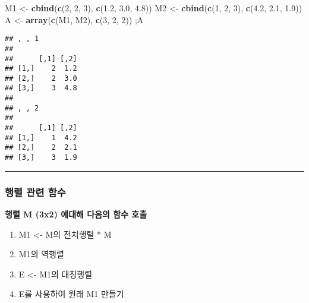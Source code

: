 \documentclass[]{article}
\newenvironment{Shaded}{\begin{snugshade}}{\end{snugshade}}
\newcommand{\KeywordTok}[1]{\textcolor[rgb]{0.13,0.29,0.53}{\textbf{#1}}}
\newcommand{\DecValTok}[1]{\textcolor[rgb]{0.00,0.00,0.81}{#1}}
\newcommand{\FloatTok}[1]{\textcolor[rgb]{0.00,0.00,0.81}{#1}}
\newcommand{\StringTok}[1]{\textcolor[rgb]{0.31,0.60,0.02}{#1}}
\newcommand{\CommentTok}[1]{\textcolor[rgb]{0.56,0.35,0.01}{\textit{#1}}}
\newcommand{\OperatorTok}[1]{\textcolor[rgb]{0.81,0.36,0.00}{\textbf{#1}}}
\newcommand{\NormalTok}[1]{#1}
\providecommand{\tightlist}{%
  \setlength{\itemsep}{0pt}\setlength{\parskip}{0pt}}
\begin{document}
\begin{Shaded}
\begin{Highlighting}[]
\NormalTok{M1 <-}\StringTok{ }\KeywordTok{cbind}\NormalTok{(}\KeywordTok{c}\NormalTok{(}\DecValTok{2}\NormalTok{, }\DecValTok{2}\NormalTok{, }\DecValTok{3}\NormalTok{), }\KeywordTok{c}\NormalTok{(}\FloatTok{1.2}\NormalTok{, }\FloatTok{3.0}\NormalTok{, }\FloatTok{4.8}\NormalTok{))}
\NormalTok{M2 <-}\StringTok{ }\KeywordTok{cbind}\NormalTok{(}\KeywordTok{c}\NormalTok{(}\DecValTok{1}\NormalTok{, }\DecValTok{2}\NormalTok{, }\DecValTok{3}\NormalTok{), }\KeywordTok{c}\NormalTok{(}\FloatTok{4.2}\NormalTok{, }\FloatTok{2.1}\NormalTok{, }\FloatTok{1.9}\NormalTok{))}
\NormalTok{A <-}\StringTok{ }\KeywordTok{array}\NormalTok{(}\KeywordTok{c}\NormalTok{(M1, M2), }\KeywordTok{c}\NormalTok{(}\DecValTok{3}\NormalTok{, }\DecValTok{2}\NormalTok{, }\DecValTok{2}\NormalTok{)) ;A}
\end{Highlighting}
\end{Shaded}

\begin{verbatim}
## , , 1
## 
##      [,1] [,2]
## [1,]    2  1.2
## [2,]    2  3.0
## [3,]    3  4.8
## 
## , , 2
## 
##      [,1] [,2]
## [1,]    1  4.2
## [2,]    2  2.1
## [3,]    3  1.9
\end{verbatim}

\begin{center}\rule{0.5\linewidth}{\linethickness}\end{center}

\subsubsection{행렬 관련 함수}\label{--}

\textbf{행렬 M (3x2) 에대해 다음의 함수 호출}

\begin{enumerate}
\def\labelenumi{\arabic{enumi}.}
\tightlist
\item
  M1 \textless{}- M의 전치행렬 * M
\item
  M1의 역행렬
\item
  E \textless{}- M1의 대칭행렬
\item
  E를 사용하여 원래 M1 만들기
\end{enumerate}

\begin{Shaded}
\end{Shaded}
\end{document}
